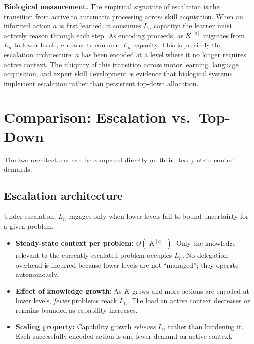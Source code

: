 \documentclass[11pt]{article}
\theoremstyle{definition}
\begin{document}
\textbf{Biological measurement.} The empirical signature of escalation
is the transition from active to automatic processing across skill
acquisition. When an informed action $a$ is first learned, it consumes
$L_n$ capacity: the learner must actively reason through each step. As
encoding proceeds, as $K^{[a]}$ migrates from $L_n$ to lower levels,
$a$ ceases to consume $L_n$ capacity. This is precisely the
escalation architecture: $a$ has been encoded at a level where it no
longer requires active context. The ubiquity of this transition across
motor learning, language acquisition, and expert skill development
\cite{Kahneman2011} is evidence that biological systems implement
escalation rather than persistent top-down allocation.

\section{Comparison: Escalation vs.\ Top-Down}
\label{sec:comparison}

The two architectures can be compared directly on their steady-state
context demands.

\subsection{Escalation architecture}

Under escalation, $L_n$ engages only when lower levels fail to bound
uncertainty for a given problem.

\begin{itemize}
\item \textbf{Steady-state context per problem:} $O(|K^{[a]}|)$.
   Only the knowledge relevant to the currently escalated problem
   occupies $L_n$. No delegation overhead is incurred because lower
   levels are not ``managed''; they operate autonomously.

\item \textbf{Effect of knowledge growth:} As $K$ grows and more
   actions are encoded at lower levels, \emph{fewer} problems reach
   $L_n$. The load on active context decreases or remains bounded as
   capability increases.

\item \textbf{Scaling property:} Capability growth \emph{relieves}
   $L_n$ rather than burdening it. Each successfully encoded action
   is one fewer demand on active context.
\end{itemize}
\end{document}
